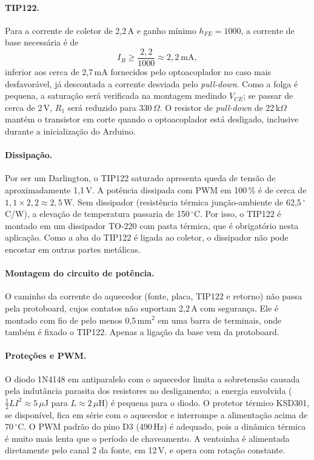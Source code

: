 \documentclass[a4paper,11pt]{article}
\begin{document}
\paragraph{TIP122.} Para a corrente de coletor de 2,2\,A e ganho mínimo $h_{FE} = 1000$, a corrente de base necessária é de
\begin{equation}
  I_B \geq \frac{2{,}2}{1000} \approx 2{,}2\ \text{mA},
\end{equation}
inferior aos cerca de 2,7\,mA fornecidos pelo optoacoplador no caso mais desfavorável, já descontada a corrente desviada pelo \textit{pull-down}. Como a folga é pequena, a saturação será verificada na montagem medindo $V_{CE}$; se passar de cerca de 2\,V, $R_1$ será reduzido para 330\,$\Omega$. O resistor de \textit{pull-down} de 22\,k$\Omega$ mantém o transistor em corte quando o optoacoplador está desligado, inclusive durante a inicialização do Arduino.

\paragraph{Dissipação.} Por ser um Darlington, o TIP122 saturado apresenta queda de tensão de aproximadamente 1,1\,V. A potência dissipada com PWM em 100\,\% é de cerca de $1{,}1 \times 2{,}2 \approx 2{,}5$\,W. Sem dissipador (resistência térmica junção-ambiente de 62,5\,\ensuremath{^\circ}C/W), a elevação de temperatura passaria de 150\,\ensuremath{^\circ}C. Por isso, o TIP122 é montado em um dissipador TO-220 com pasta térmica, que é obrigatório nesta aplicação. Como a aba do TIP122 é ligada ao coletor, o dissipador não pode encostar em outras partes metálicas.

\paragraph{Montagem do circuito de potência.} O caminho da corrente do aquecedor (fonte, placa, TIP122 e retorno) não passa pela protoboard, cujos contatos não suportam 2,2\,A com segurança. Ele é montado com fio de pelo menos 0,5\,mm$^2$ em uma barra de terminais, onde também é fixado o TIP122. Apenas a ligação da base vem da protoboard.

\paragraph{Proteções e PWM.} O diodo 1N4148 em antiparalelo com o aquecedor limita a sobretensão causada pela indutância parasita dos resistores no desligamento; a energia envolvida ($\tfrac{1}{2} L I^2 \approx 5\,\mu$J para $L \approx 2\,\mu$H) é pequena para o diodo. O protetor térmico KSD301, se disponível, fica em série com o aquecedor e interrompe a alimentação acima de 70\,\ensuremath{^\circ}C. O PWM padrão do pino D3 (490\,Hz) é adequado, pois a dinâmica térmica é muito mais lenta que o período de chaveamento. A ventoinha é alimentada diretamente pelo canal 2 da fonte, em 12\,V, e opera com rotação constante.
\end{document}
